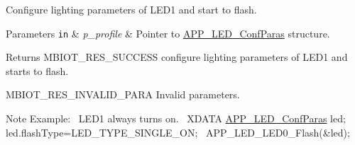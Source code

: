 Configure lighting parameters of L\+E\+D1 and start to flash. 


\begin{DoxyParams}[1]{Parameters}
\mbox{\tt in}  & {\em p\+\_\+profile} & Pointer to \hyperlink{struct_a_p_p___l_e_d___conf_paras}{A\+P\+P\+\_\+\+L\+E\+D\+\_\+\+Conf\+Paras} structure.\\
\hline
\end{DoxyParams}
\begin{DoxyReturn}{Returns}
M\+B\+I\+O\+T\+\_\+\+R\+E\+S\+\_\+\+S\+U\+C\+C\+E\+SS configure lighting parameters of L\+E\+D1 and starts to flash. 

M\+B\+I\+O\+T\+\_\+\+R\+E\+S\+\_\+\+I\+N\+V\+A\+L\+I\+D\+\_\+\+P\+A\+RA Invalid parameters.
\end{DoxyReturn}
\begin{DoxyNote}{Note}
Example\+:~\newline
 L\+E\+D1 always turns on.~\newline
 X\+D\+A\+TA \hyperlink{struct_a_p_p___l_e_d___conf_paras}{A\+P\+P\+\_\+\+L\+E\+D\+\_\+\+Conf\+Paras} led;~\newline
 led.\+flash\+Type=L\+E\+D\+\_\+\+T\+Y\+P\+E\+\_\+\+S\+I\+N\+G\+L\+E\+\_\+\+ON;~\newline
 A\+P\+P\+\_\+\+L\+E\+D\+\_\+\+L\+E\+D0\+\_\+\+Flash(\&led);~\newline

\end{DoxyNote}
